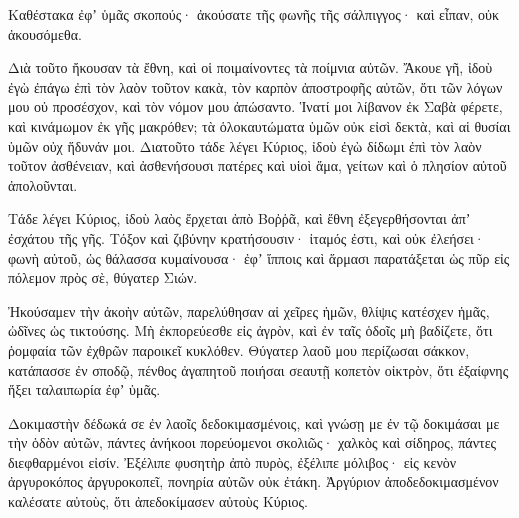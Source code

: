 {Καθέστακα ἐφʼ ὑμᾶς σκοπούς· ἀκούσατε τῆς φωνῆς τῆς σάλπιγγος· καὶ εἶπαν, οὐκ ἀκουσόμεθα.
\par }{\PP {}Διὰ τοῦτο ἤκουσαν τὰ ἔθνη, καὶ οἱ ποιμαίνοντες τὰ ποίμνια αὐτῶν.
Ἄκουε γῆ, ἰδοὺ ἐγὼ ἐπάγω ἐπὶ τὸν λαὸν τοῦτον κακὰ, τὸν καρπὸν ἀποστροφῆς αὐτῶν, ὅτι τῶν λόγων μου οὐ προσέσχον, καὶ τὸν νόμον μου ἀπώσαντο.
Ἱνατί μοι λίβανον ἐκ Σαβὰ φέρετε, καὶ κινάμωμον ἐκ γῆς μακρόθεν; τὰ ὁλοκαυτώματα ὑμῶν οὐκ εἰσὶ δεκτὰ, καὶ αἱ θυσίαι ὑμῶν οὐχ ἥδυνάν μοι.
Διατοῦτο τάδε λέγει Κύριος, ἰδοὺ ἐγὼ δίδωμι ἐπὶ τὸν λαὸν τοῦτον ἀσθένειαν, καὶ ἀσθενήσουσι πατέρες καὶ υἱοὶ ἅμα, γείτων καὶ ὁ πλησίον αὐτοῦ ἀπολοῦνται.
\par }{\PP {}Τάδε λέγει Κύριος, ἰδοὺ λαὸς ἔρχεται ἀπὸ Βοῤῥᾶ, καὶ ἔθνη ἐξεγερθήσονται ἀπʼ ἐσχάτου τῆς γῆς.
Τόξον καὶ ζιβύνην κρατήσουσιν· ἰταμός ἐστι, καὶ οὐκ ἐλεήσει· φωνὴ αὐτοῦ, ὡς θάλασσα κυμαίνουσα· ἐφʼ ἵπποις καὶ ἅρμασι παρατάξεται ὡς πῦρ εἰς πόλεμον πρὸς σὲ, θύγατερ Σιών.
\par }{\PP {}Ἠκούσαμεν τὴν ἀκοὴν αὐτῶν, παρελύθησαν αἱ χεῖρες ἡμῶν, θλίψις κατέσχεν ἡμᾶς, ὠδῖνες ὡς τικτούσης.
Μὴ ἐκπορεύεσθε εἰς ἀγρὸν, καὶ ἐν ταῖς ὁδοῖς μὴ βαδίζετε, ὅτι ῥομφαία τῶν ἐχθρῶν παροικεῖ κυκλόθεν.
Θύγατερ λαοῦ μου περίζωσαι σάκκον, κατάπασσε ἐν σποδῷ, πένθος ἀγαπητοῦ ποιήσαι σεαυτῇ κοπετὸν οἰκτρὸν, ὅτι ἐξαίφνης ἥξει ταλαιπωρία ἐφʼ ὑμᾶς.
\par }{\PP {}Δοκιμαστὴν δέδωκά σε ἐν λαοῖς δεδοκιμασμένοις, καὶ γνώσῃ με ἐν τῷ δοκιμάσαι με τὴν ὁδὸν αὐτῶν,
πάντες ἀνήκοοι πορεύομενοι σκολιῶς· χαλκὸς καὶ σίδηρος, πάντες διεφθαρμένοι εἰσίν.
Ἐξέλιπε φυσητὴρ ἀπὸ πυρὸς, ἐξέλιπε μόλιβος· εἰς κενὸν ἀργυροκόπος ἀργυροκοπεῖ, πονηρία αὐτῶν οὐκ ἐτάκη.
Ἀργύριον ἀποδεδοκιμασμένον καλέσατε αὐτοὺς, ὅτι ἀπεδοκίμασεν αὐτοὺς Κύριος.

}
